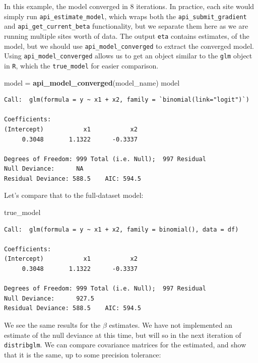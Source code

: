 \documentclass[]{elsarticle} %
\newenvironment{Shaded}{\begin{snugshade}}{\end{snugshade}}
\newcommand{\KeywordTok}[1]{\textcolor[rgb]{0.13,0.29,0.53}{\textbf{#1}}}
\newcommand{\NormalTok}[1]{#1}
\newcommand{\StringTok}[1]{\textcolor[rgb]{0.31,0.60,0.02}{#1}}
\begin{document}
In this example, the model converged in \(8\) iterations. In practice, each site would simply run \texttt{api\_estimate\_model}, which wraps both the \texttt{api\_submit\_gradient} and \texttt{api\_get\_current\_beta} functionality, but we separate them here as we are running multiple sites worth of data. The output \texttt{eta} contains estimates, of the model, but we should use \texttt{api\_model\_converged} to extract the converged model. Using \texttt{api\_model\_converged} allows us to get an object similar to the \texttt{glm} object in \texttt{R}, which the \texttt{true\_model} for easier comparison.

\begin{Shaded}
\begin{Highlighting}[]
\NormalTok{model =}\StringTok{ }\KeywordTok{api\_model\_converged}\NormalTok{(model\_name)}
\NormalTok{model}
\end{Highlighting}
\end{Shaded}

\begin{verbatim}
Call:  glm(formula = y ~ x1 + x2, family = `binomial(link="logit")`)

Coefficients:
(Intercept)           x1           x2  
     0.3048       1.1322      -0.3337  

Degrees of Freedom: 999 Total (i.e. Null);  997 Residual
Null Deviance:      NA 
Residual Deviance: 588.5    AIC: 594.5
\end{verbatim}

Let's compare that to the full-dataset model:

\begin{Shaded}
\begin{Highlighting}[]
\NormalTok{true\_model}
\end{Highlighting}
\end{Shaded}

\begin{verbatim}
Call:  glm(formula = y ~ x1 + x2, family = binomial(), data = df)

Coefficients:
(Intercept)           x1           x2  
     0.3048       1.1322      -0.3337  

Degrees of Freedom: 999 Total (i.e. Null);  997 Residual
Null Deviance:      927.5 
Residual Deviance: 588.5    AIC: 594.5
\end{verbatim}

We see the same results for the \(\beta\) estimates. We have not implemented an estimate of the null deviance at this time, but will so in the next iteration of \texttt{distribglm}. We can compare covariance matrices for the estimated, and show that it is the same, up to some precision tolerance:
\end{document}
